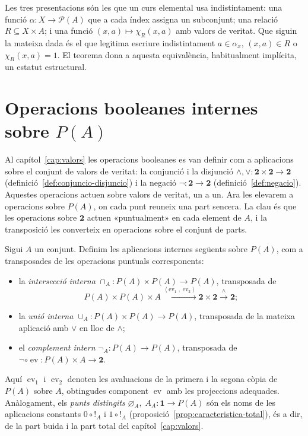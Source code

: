 \begin{observacio}\label{obs:parts-parametritzades-classica}
Les tres presentacions són les que un curs elemental usa
indistintament: una funció \(\alpha\colon X\to\mathcal P(A)\) que a cada
índex assigna un subconjunt; una relació \(R\subseteq X\times A\); i una
funció \((x,a)\mapsto\chi_R(x,a)\) amb valors de veritat. Que siguin la
mateixa dada és el que legitima escriure indistintament \(a\in\alpha_x\),
\((x,a)\in R\) o \(\chi_R(x,a)=1\). El teorema
dona a aquesta equivalència, habitualment implícita, un estatut
estructural.
\end{observacio}

\section{\texorpdfstring{Operacions booleanes internes sobre \(P(A)\)}{Operacions booleanes internes sobre P(A)}}\label{sec:booleanes-internes}

Al capítol~\ref{cap:valors} les operacions booleanes es van definir com a
aplicacions sobre el conjunt de valors de veritat: la conjunció i la
disjunció \(\wedge,\vee\colon\mathbf2\times\mathbf2\to\mathbf2\)
(definició~\ref{def:conjuncio-disjuncio}) i la negació
\(\neg\colon\mathbf2\to\mathbf2\) (definició~\ref{def:negacio}). Aquestes
operacions actuen sobre valors de veritat, un a un. Ara les elevarem a
operacions sobre \(P(A)\), on cada punt reuneix una part sencera. La clau
és que les operacions sobre \(\mathbf2\) actuen «puntualment» en cada
element de \(A\), i la transposició les converteix en operacions sobre el
conjunt de parts.

\begin{definicio}\label{def:booleanes-internes}
Sigui \(A\) un conjunt. Definim les aplicacions internes següents sobre
\(P(A)\), com a transposades de les operacions puntuals corresponents:
\begin{itemize}
\item la \emph{intersecció interna}
\(\cap_A\colon P(A)\times P(A)\to P(A)\), transposada de
\[
P(A)\times P(A)\times A
\xrightarrow{\;\langle\operatorname{ev}_1,\operatorname{ev}_2\rangle\;}
\mathbf2\times\mathbf2
\xrightarrow{\;\wedge\;}
\mathbf2 ;
\]
\item la \emph{unió interna}
\(\cup_A\colon P(A)\times P(A)\to P(A)\), transposada de la mateixa
aplicació amb \(\vee\) en lloc de \(\wedge\);
\item el \emph{complement intern}
\(\neg_A\colon P(A)\to P(A)\), transposada de
\(\neg\circ\operatorname{ev}\colon P(A)\times A\to\mathbf2\).
\end{itemize}
Aquí \(\operatorname{ev}_1\) i \(\operatorname{ev}_2\) denoten les
avaluacions de la primera i la segona còpia de \(P(A)\) sobre \(A\),
obtingudes component \(\operatorname{ev}\) amb les projeccions adequades.
Anàlogament, els \emph{punts distingits} \(\varnothing_A,\;A_A\colon
\mathbf1\to P(A)\) són els noms de les aplicacions constants
\(0\circ{!}_A\) i \(1\circ{!}_A\) (proposició~\ref{prop:caracteristica-total}),
és a dir, de la part buida i la part total del capítol~\ref{cap:valors}.
\end{definicio}

